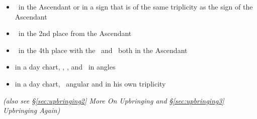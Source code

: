 \begin{itemize}[topsep=0pt,itemsep=0pt]
\item \Jupiter\, in the Ascendant or in a sign that is of the same triplicity as the sign of the Ascendant 

\item \Jupiter\, in the 2nd place from the Ascendant

\item \Jupiter\, in the 4th place with the \Moon\, and \Mercury\, both in the Ascendant

\item in a day chart, \Saturn, \Jupiter, and \Mercury\, in angles

\item in a day chart, \Saturn\, angular and in his own triplicity
\end{itemize}

\textsl{(also see \S\ref{sec:upbringing2} More On Upbringing and \S\ref{sec:upbringing3} Upbringing Again)}




